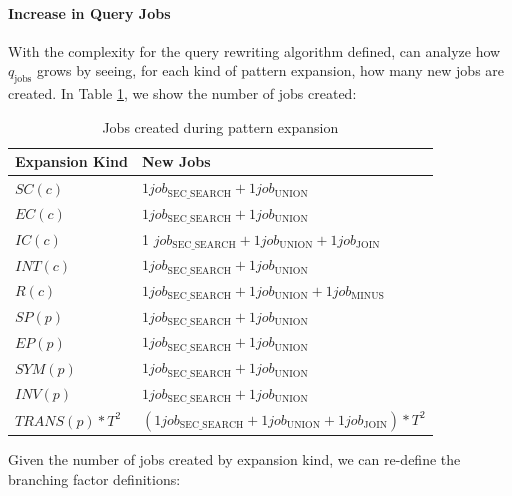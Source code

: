 \paragraph{Increase in Query Jobs} With the complexity for the query rewriting algorithm defined, can analyze how $q_{\text{jobs}}$ grows by seeing, for each kind of pattern expansion, how many new jobs are created. In Table \ref{cha5:table:inference-branching-jobs}, we show the number of jobs created:

\begin{table}[h]
    \centering
    \begin{tabular}{|l|l|}
    \hline
    Expansion Kind & New Jobs \\
    \hline
    $SC(c)$          & $1 job_{\text{SEC\_SEARCH}} + 1 job_{\text{UNION}}$ \\
    \hline
    $EC(c)$          & $1 job_{\text{SEC\_SEARCH}} + 1 job_{\text{UNION}}$ \\
    \hline
    $IC(c)$          & 1 $job_{\text{SEC\_SEARCH}} + 1 job_{\text{UNION}} + 1 job_{\text{JOIN}}$ \\
    \hline
    $INT(c)$         & $1 job_{\text{SEC\_SEARCH}} + 1 job_{\text{UNION}}$ \\
    \hline
    $R(c)$           & $1 job_{\text{SEC\_SEARCH}} + 1 job_{\text{UNION}} + 1 job_{\text{MINUS}}$ \\
    \hline
    $SP(p)$          & $1 job_{\text{SEC\_SEARCH}} + 1 job_{\text{UNION}}$ \\
    \hline
    $EP(p)$          & $1 job_{\text{SEC\_SEARCH}} + 1 job_{\text{UNION}}$ \\
    \hline
    $SYM(p)$         & $1 job_{\text{SEC\_SEARCH}} + 1 job_{\text{UNION}}$ \\
    \hline
    $INV(p)$         & $1 job_{\text{SEC\_SEARCH}} + 1 job_{\text{UNION}}$ \\
    \hline
    $TRANS(p) * T^2$ & $(1job_{\text{SEC\_SEARCH}} + 1 job_{\text{UNION}} + 1 job_{\text{JOIN}}) * T^2$\\
    \hline
    \end{tabular}
    \caption{Jobs created during pattern expansion}
    \label{cha5:table:inference-branching-jobs}
\end{table}

Given the number of jobs created by expansion kind, we can re-define the branching factor definitions:

